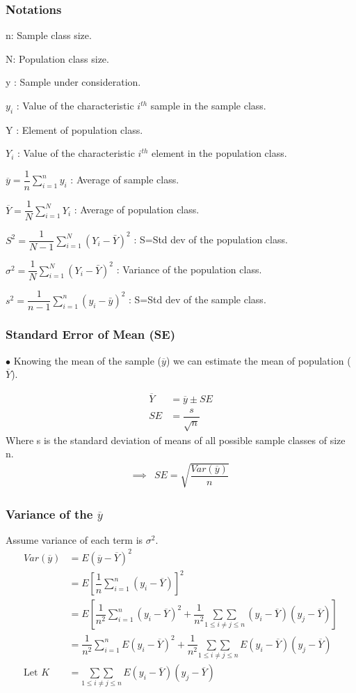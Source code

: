 \documentclass{beamer}
\begin{document}
\begin{frame}
\frametitle{Notations}

n: Sample class size.

N: Population class size.

y : Sample under consideration.

$y_i$ : Value of the characteristic $i^{th}$ sample in the sample class.

Y : Element of population class.

$Y_i$ : Value of the characteristic $i^{th}$ element in the population class.

$\overline{y}=\dfrac{1}{n}\sum_{i=1}^{n}y_i$ : Average of sample class.

$\overline{Y}=\dfrac{1}{N}\sum_{i=1}^{N}Y_i$ : Average of population class.

$S^2 = \dfrac{1}{N-1} \sum_{i=1}^{N} (Y_i-\bar{Y})^2$ : S=Std dev of the population class.

$\sigma^2=\dfrac{1}{N} \sum_{i=1}^{N} (Y_i-\bar{Y})^2$ : Variance of the population class.

$s^2 = \dfrac{1}{n-1} \sum_{i=1}^{n} (y_i-\bar{y})^2$ : S=Std dev of the sample class.

\end{frame}
\begin{frame}
\frametitle{Standard Error of Mean (SE)}
$\bullet$ Knowing the mean of the sample ($\overline{y}$) we can estimate the mean of population ($\overline{Y}$).

\begin{align}
\overline{Y}&=\overline{y} \pm SE\\
SE &= \dfrac{s}{\sqrt{n}}
\end{align}
Where s is the standard deviation of means of all possible sample classes of size n.
\begin{align}
\implies & SE= \sqrt{\dfrac{Var(\overline{y})}{n}}
\end{align}
\end{frame}

\begin{frame}
\frametitle{\textbf{Variance of the $\overline{y}$}}
Assume variance of each term is $\sigma^2$.
\begin{align*}
Var(\overline{y})&= E(\overline{y}-\overline{Y})^2\\
& = E\left[\dfrac{1}{n} \sum_{i=1}^{n}(y_i-\overline{Y})\right]^2\\
& = E\left[\dfrac{1}{n^2} \sum_{i=1}^{n} (y_i-\overline{Y})^2 + \dfrac{1}{n^2} \underset{1\leq i\neq j\leq n}{\sum\sum}\, (y_i-\overline{Y})(y_j-\overline{Y})\right]\\
& = \dfrac{1}{n^2}\sum_{i=1}^{n} E(y_i-\overline{Y})^2+\dfrac{1}{n^2} \underset{1\leq i\neq j\leq n}{\sum\sum}\, E(y_i-\overline{Y})(y_j-\overline{Y})\\
 \text{Let } K &=\underset{1\leq i\neq j\leq n}{\sum\sum}\, E(y_i-\overline{Y})(y_j-\overline{Y})
\end{align*}
\end{frame}
\end{document}
